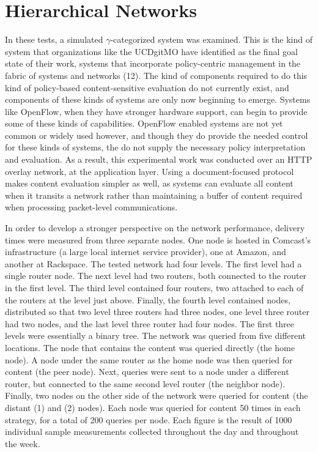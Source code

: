 \section{Hierarchical Networks}
In these tests, a simulated $\gamma$-categorized system was examined.  This is the kind of system that organizations like the UCDgitMO have identified as the final goal state of their work, systems that incorporate policy-centric management in the fabric of systems and networks (12).  The kind of components required to do this kind of policy-based content-sensitive evaluation do not currently exist, and components of these kinds of systems are only now beginning to emerge.  Systems like OpenFlow, when they have stronger hardware support, can begin to provide some of these kinds of capabilities.  OpenFlow enabled systems are not yet common or widely used however, and though they do provide the needed control for these kinds of systems, the do not supply the necessary policy interpretation and evaluation.  As a result, this experimental work was conducted over an HTTP overlay network, at the application layer.  Using a document-focused protocol makes content evaluation simpler as well, as systems can evaluate all content when it transits a network rather than maintaining a buffer of content required when processing packet-level communications.

In order to develop a stronger perspective on the network performance, delivery times were measured from three separate nodes.   One node is hosted in Comcast's infrastructure (a large local internet service provider), one at Amazon, and another at Rackspace.  The tested network had four levels.  The first level had a single router node.  The next level had two routers, both connected to the router in the first level.  The third level contained four routers, two attached to each of the routers at the level just above.  Finally, the fourth level contained nodes, distributed so that two level three routers had three nodes, one level three router had two nodes, and the last level three router had four nodes.  The first three levels were essentially a binary tree.  The network was queried from five different locations.  The node that contains the content was queried directly (the home node).  A node under the same router as the home node was then queried for content (the peer node).  Next, queries were sent to a node under a different router, but connected to the same second level router (the neighbor node).  Finally, two nodes on the other side of the network were queried for content (the distant (1) and (2) nodes).  Each node was queried for content 50 times in each strategy, for a total of 200 queries per node.  Each figure is the result of 1000 individual sample measurements collected throughout the day and throughout the week.

